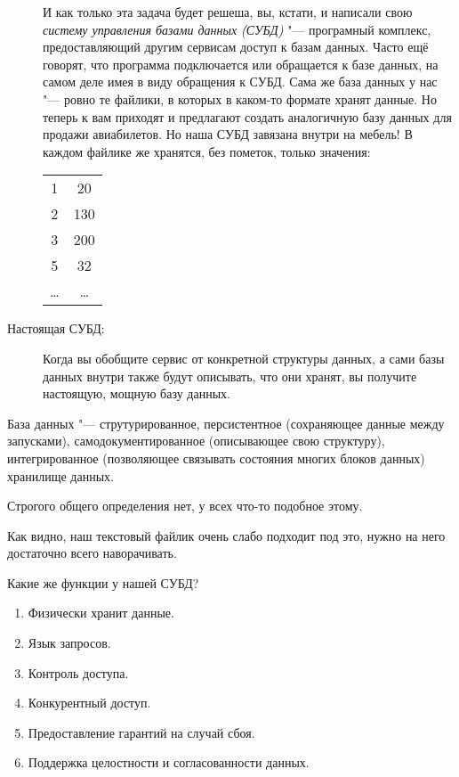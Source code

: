 \begin{description}
	И как только эта задача будет решеша, вы, кстати, и написали свою \textit{систему управления базами данных (СУБД)}
	"--- програмный комплекс, предоставляющий другим сервисам доступ к базам данных.
	Часто ещё говорят, что программа подключается или обращается к базе данных, на самом деле имея в виду обращения к СУБД.
	Сама же база данных у нас "--- ровно те файлики, в которых в каком-то формате хранят данные.
	Но теперь к вам приходят и предлагают создать аналогичную базу данных для продажи авиабилетов.
	Но наша СУБД завязана внутри на мебель!
	В каждом файлике же хранятся, без пометок, только значения:
	\begin{center}\begin{tabular}{|cc|}
		\hline
		1 & 20 \\
		2 & 130 \\
		3 & 200 \\
		5 & 32  \\
		\ldots & \ldots \\
		\hline
	\end{tabular}\end{center}

\item[Настоящая СУБД:]
	Когда вы обобщите сервис от конкретной структуры данных, а сами базы данных внутри также будут описывать, что они хранят,
	вы получите настоящую, мощную базу данных.
\end{description}

\begin{Def}
	База данных "---
	струтурированное,
	персистентное (сохраняющее данные между запусками),
	самодокументированное (описывающее свою структуру),
	интегрированное (позволяющее связывать состояния многих блоков данных)
	хранилище данных.

	Строгого общего определения нет, у всех что-то подобное этому.
\end{Def}
Как видно, наш текстовый файлик очень слабо подходит под это, нужно на него достаточно всего наворачивать.

Какие же функции у нашей СУБД?
\begin{enumerate}
	\item Физически хранит данные.
	\item Язык запросов.
	\item Контроль доступа.
	\item Конкурентный доступ.
	\item Предоставление гарантий на случай сбоя.
	\item Поддержка целостности и согласованности данных.
\end{enumerate}

